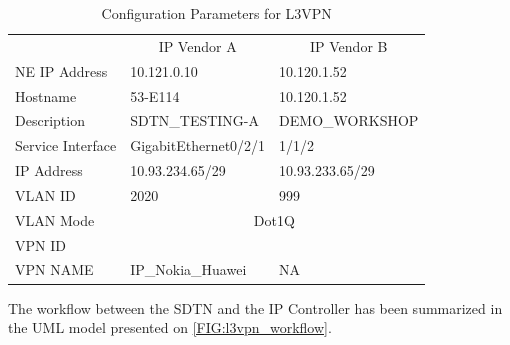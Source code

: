 \documentclass[a4paper,fleqn]{cas-dc}
\begin{document}
\begin{table}[]
\caption{Configuration Parameters for L3VPN}
\begin{adjustbox}{width=0.5\textwidth}
\small
\begin{tabular}{lll}
& \multicolumn{1}{c}{IP Vendor A} & \multicolumn{1}{c}{IP Vendor B} \\
{\color[HTML]{000000} NE IP Address} & {\color[HTML]{000000} 10.121.0.10}          & {\color[HTML]{000000} 10.120.1.52}     \\
\rowcolor[HTML]{F2F2F2} 
{\color[HTML]{000000} Hostname}            & {\color[HTML]{000000} 53-E114}              & {\color[HTML]{000000} 10.120.1.52}     \\
{\color[HTML]{000000} Description}         & {\color[HTML]{000000} SDTN\_TESTING-A}      & {\color[HTML]{000000} DEMO\_WORKSHOP} \\
\rowcolor[HTML]{F2F2F2} 
{\color[HTML]{000000} Service   Interface} & {\color[HTML]{000000} GigabitEthernet0/2/1} & {\color[HTML]{000000} 1/1/2}           \\
{\color[HTML]{000000} IP Address}          & {\color[HTML]{000000} 10.93.234.65/29}      & {\color[HTML]{000000} 10.93.233.65/29} \\
\rowcolor[HTML]{F2F2F2} 
{\color[HTML]{000000} VLAN   ID}           & {\color[HTML]{000000} 2020}                 & {\color[HTML]{000000} 999}             \\
{\color[HTML]{000000} VLAN Mode}           & \multicolumn{2}{c}{{\color[HTML]{000000} Dot1Q}}                                     \\
\rowcolor[HTML]{F2F2F2} 
{\color[HTML]{000000} VPN   ID}            & \multicolumn{2}{c}{\cellcolor[HTML]{F2F2F2}{\color[HTML]{000000} 15}} \\
{\color[HTML]{000000} VPN NAME}           & {\color[HTML]{000000} IP\_Nokia\_Huawei}                 & {\color[HTML]{000000} NA} 
\end{tabular}
\end{adjustbox}
\label{TAB:discovered_ip_l3vpn}
\end{table}

The workflow between the SDTN and the IP Controller has been summarized in the UML model presented on \cref{FIG:l3vpn_workflow}. 
\end{document}
